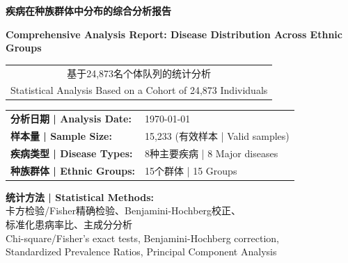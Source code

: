 \documentclass[12pt,a4paper]{article}
\begin{document}
\begin{titlepage}
    \centering
    \vspace*{2cm}
    
    {\Huge\bfseries\color{titleblue} 疾病在种族群体中分布的综合分析报告}
    
    \vspace{0.5cm}
    
    {\Large\bfseries\color{titleblue} Comprehensive Analysis Report: Disease Distribution Across Ethnic Groups}
    
    \vspace{2cm}
    
    \begin{center}
        \begin{tabular}{c}
            \Large 基于24,873名个体队列的统计分析 \\
            \Large Statistical Analysis Based on a Cohort of 24,873 Individuals \\
        \end{tabular}
    \end{center}
    
    \vspace{3cm}
    
    \begin{center}
        \large
        \begin{tabular}{ll}
            \textbf{分析日期 | Analysis Date:} & \today \\
            \textbf{样本量 | Sample Size:} & 15,233 (有效样本 | Valid samples) \\
            \textbf{疾病类型 | Disease Types:} & 8种主要疾病 | 8 Major diseases \\
            \textbf{种族群体 | Ethnic Groups:} & 15个群体 | 15 Groups \\
        \end{tabular}
    \end{center}
    
    \vfill
    
    {\large 
    \textbf{统计方法 | Statistical Methods:} \\
    卡方检验/Fisher精确检验、Benjamini-Hochberg校正、\\
    标准化患病率比、主成分分析 \\
    Chi-square/Fisher's exact tests, Benjamini-Hochberg correction,\\
    Standardized Prevalence Ratios, Principal Component Analysis
    }
    
\end{titlepage}
\end{document}
